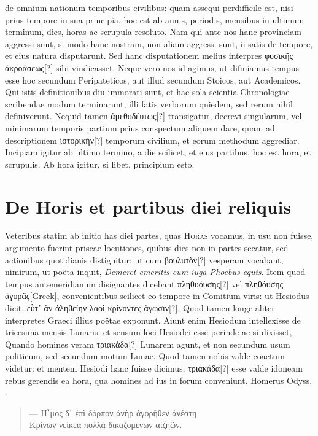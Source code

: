 de omnium nationum temporibus civilibus: quam assequi perdifficile
est, nisi prius tempore in sua principia, hoc est ab annis, periodis,
mensibus in ultimum terminum, dies, horas ac scrupula resoluto.
Nam qui ante nos hanc provinciam aggressi sunt, si modo hanc nostram,
non aliam aggressi sunt, ii satis de tempore, et eius natura
disputarunt.
Sed hanc disputationem melius interpres
 \textgreek{φυσικῆς ἀκροάσεως[?]}
sibi vindicasset.
Neque vero nos id agimus, ut difiniamus
tempus esse hoc secundum Peripateticos, aut illud secundum Stoicos,
aut Academicos.
Qui istis definitionibus diu immorati sunt, et hac
sola scientia Chronologiae scribendae modum terminarunt, illi fatis
verborum quiedem, sed rerum nihil definiverunt.
%
Nequid tamen
\textgreek{ἀμεθοδέυτως[?]} transigatur, decrevi singularum, vel
 minimarum temporis
partium prius conspectum aliquem dare, quam ad descriptionem
\textgreek{ἱστορικὴν[?]} temporum civilium, et eorum methodum aggrediar.
Incipiam igitur ab ultimo termino, a die scilicet, et eius partibus,
hoc est hora, et scrupulis.
Ab hora igitur, si libet, principium esto.
\section{De Horis et partibus diei reliquis}
Veteribus statim ab initio has diei partes, quas \textsc{Horas}
vocamus, in usu non fuisse, argumento fuerint priscae locutiones,
quibus dies non in partes secatur, sed actionibus quotidianis
distiguitur: ut cum \textgreek{βουλυτὸν[?]} vesperam vocabant, 
nimirum, ut poëta
inquit, \textit{Demeret emeritis cum iuga Phoebus equis}.
Item quod tempus
antemeridianum disignantes dicebant \textgreek{πληθυόυσης[?]}
 vel \textgreek{πληθόυσης ἀγορᾶς[Greek]},
convenientibus scilicet eo tempore in Comitium viris: ut Hesiodus dicit,
\textgreek{εὖτ᾽ ἂν ἀληθείην λαοὶ κρίνοντες ἄγωσιν[?]}.
Quod tamen longe aliter interpretes
Graeci illius poëtae exponunt.
Aiunt enim Hesiodum intellexisse
de tricesima mensis Lunaris: et sensum loci Hesiodei esse perinde
ac si dixisset, Quando homines veram \textgreek{τριακάδα[?]} Lunarem agunt, et
non secundum usum politicum, sed secundum motum Lunae.
Quod
tamen nobis valde coactum videtur: et mentem Hesiodi hanc fuisse dicimus:
\textgreek{τριακάδα[?]} esse valde idoneam rebus gerendis ea hora,
 qua homines
ad ius in forum conveniunt.
Homerus Odyss. \textgreek{}. %
\begin{verse}
\textgreek{— Η῏μος δ᾽ ἐπὶ δόρπον ἀνὴρ ἀγορῆθεν ἀνέστη}\\
\textgreek{Κρίνων νείκεα πολλὰ δικαζομένων αἰζηῶν}.
\end{verse}

